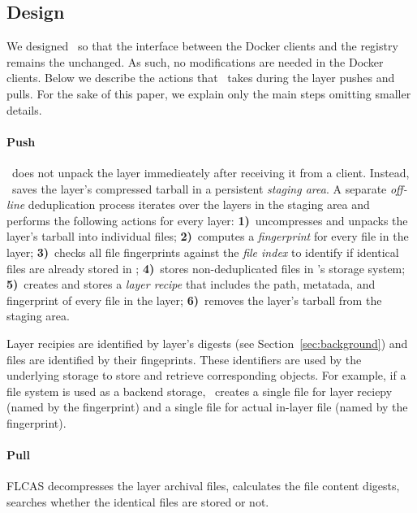 \subsection{Design}
\label{sec:design}

We designed \sysname\ so that the interface between the Docker clients and the
registry remains the unchanged.
%
As such, no modifications are needed in the Docker clients.
%
Below we describe the actions that \sysname\ takes during the layer pushes and
pulls.
%
For the sake of this paper, we explain only the main steps omitting smaller
details.

\paragraph{Push}
%
\sysname\ does not unpack the layer immedieately after receiving it from a
client.
%
Instead, \sysname\ saves the layer's compressed tarball in a persistent
\emph{staging area}.
%
A separate \emph{off-line} deduplication process iterates over the layers in
the staging area and performs the following actions for every layer:
%
\textbf{1)}~uncompresses and unpacks the layer's tarball into individual files;
%
\textbf{2)}~computes a \emph{fingerprint} for every file in the layer;
%
\textbf{3)}~checks all file fingerprints against the \emph{file index} to
identify if identical files are already stored in \sysname;
%
\textbf{4)}~stores non-deduplicated files in \sysname's storage system;
%
\textbf{5)}~creates and stores a \emph{layer recipe} that includes the path,
metatada, and fingerprint of every file in the layer;
%
\textbf{6)}~removes the layer's tarball from the staging area.

Layer recipies are identified by layer's digests (see
Section~\ref{sec:background}) and files are identified by their fingeprints.
%
These identifiers are used by the underlying storage to store and retrieve
corresponding objects.
%
For example, if a file system is used as a backend storage, \sysname\ creates a
single file for layer reciepy (named by the fingerprint) and a single file for
actual in-layer file (named by the fingerprint).


\paragraph{Pull}

FLCAS decompresses the layer archival files,
calculates the file content digests, searches whether the identical files are stored or not. 

